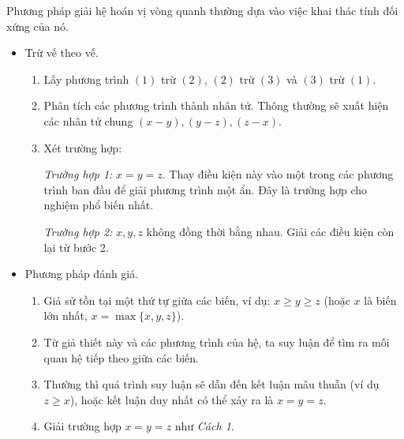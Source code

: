 \documentclass[12pt,a4paper,oneside]{book}
\theoremstyle{theorem}
\theoremstyle{definition}
\begin{document}
Phương pháp giải hệ hoán vị vòng quanh thường dựa vào việc khai thác tính đối xứng của nó.
\begin{itemize}
    \item [\textit{Cách 1:}] Trừ vế theo vế.
    \begin{enumerate}
        \item Lấy phương trình $(1)$ trừ $(2)$, $(2)$ trừ $(3)$ và $(3)$ trừ $(1)$.
        \item Phân tích các phương trình thành nhân tử. Thông thường sẽ xuất hiện các nhân tử chung $(x-y), (y-z), (z-x)$.
        \item Xét trường hợp:
        
\textit{Trường hợp 1:} $x=y=z$. Thay điều kiện này vào một trong các phương trình ban đầu để giải phương trình một ẩn. Đây là trường hợp cho nghiệm phổ biến nhất.


\textit{Trường hợp 2:} $x,y,z$ không đồng thời bằng nhau. Giải các điều kiện còn lại từ bước 2.
    \end{enumerate}
    \item [\textit{Cách 2:}] Phương pháp đánh giá.
    \begin{enumerate}
        \item Giả sử tồn tại một thứ tự giữa các biến, ví dụ: $x\geq y\geq z$ (hoặc $x$ là biến lớn nhất, $x=\max\{x,y,z\}$).
        \item Từ giả thiết này và các phương trình của hệ, ta suy luận để tìm ra mối quan hệ tiếp theo giữa các biến.
        \item Thường thì quá trình suy luận sẽ dẫn đến kết luận mâu thuẫn (ví dụ $z\geq x$), hoặc kết luận duy nhất có thể xảy ra là $x=y=z$.
        \item  Giải trường hợp $x=y=z$ như \textit{Cách 1}.
    \end{enumerate}
\end{itemize}
\end{document}
